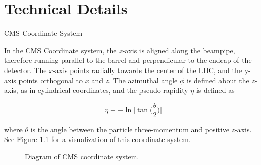 \chapter{Technical Details}
\begin{section}{CMS Coordinate System}

In the CMS Coordinate system, the $z$-axis is aligned along the beampipe, therefore running parallel to the barrel and perpendicular to the endcap of the detector. The $x$-axis points radially towards the center of the LHC, and the y-axis points orthogonal to $x$ and $z$. The azimuthal angle $\phi$ is defined about the $z$-axis, as in cylindrical coordinates, and the pseudo-rapidity $\eta$ is defined as

\begin{equation}
    \eta \equiv -\ln{\bigg[ \tan{\bigg( \frac{\theta}{2} \bigg)} \bigg]}
\end{equation}

\noindent where $\theta$ is the angle between the particle three-momentum and positive $z$-axis. See Figure \ref{fig:cms-coords} for a visualization of this coordinate system.

\begin{figure}[htb]
\begin{center}

\end{center}
\caption{Diagram of CMS coordinate system.}
\label{fig:cms-coords}
\end{figure}

\end{section}

